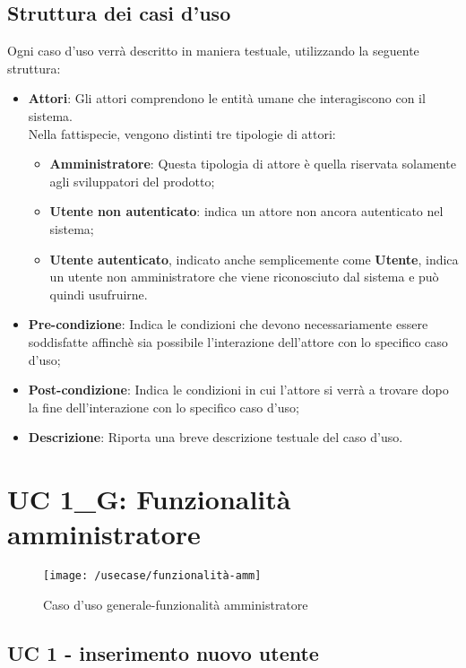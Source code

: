 \subsection{Struttura dei casi d'uso}
Ogni caso d'uso verrà descritto in maniera testuale, utilizzando la seguente struttura:
\begin{itemize}
	\item \textbf{Attori}: Gli attori comprendono le entità umane che interagiscono con il sistema. \\ 
	Nella fattispecie, vengono distinti tre tipologie di attori:
	\begin{itemize}
		\item \textbf{Amministratore}: Questa tipologia di attore è quella riservata solamente agli sviluppatori del prodotto;
		\item \textbf{Utente non autenticato}: indica un attore non ancora autenticato nel sistema;
		\item \textbf{Utente autenticato}, indicato anche semplicemente come \textbf{Utente}, indica un utente non amministratore che viene riconosciuto dal sistema e può quindi usufruirne.
	\end{itemize}
	\item \textbf{Pre-condizione}: Indica le condizioni che devono necessariamente essere soddisfatte affinchè sia possibile l'interazione dell'attore con lo specifico caso d'uso;
	\item \textbf{Post-condizione}: Indica le condizioni in cui l'attore si verrà a trovare dopo la fine dell'interazione con lo specifico caso d'uso;
	\item \textbf{Descrizione}: Riporta una breve descrizione testuale del caso d'uso.
\end{itemize}
\section{UC 1\_G: Funzionalità amministratore}
\begin{figure}[h]
	\centering
	\texttt{[image: /usecase/funzionalità-amm]}
	\caption{Caso d'uso generale-funzionalità amministratore}
\end{figure}

\subsection{UC 1 - inserimento nuovo utente}

